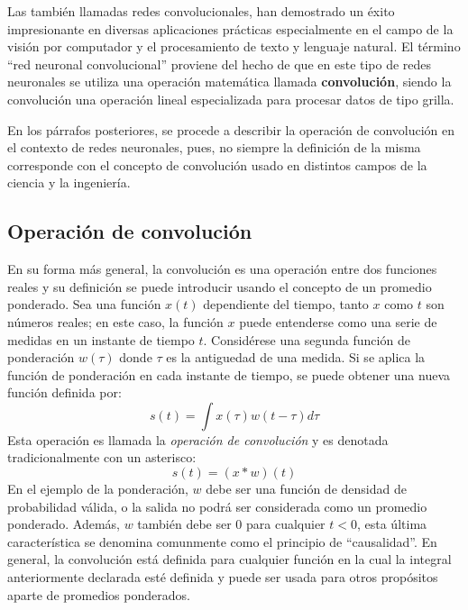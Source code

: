     Las también llamadas redes convolucionales, han demostrado un éxito impresionante en diversas 
    aplicaciones prácticas especialmente en el campo de la visión por computador y el procesamiento de texto y lenguaje natural. 
    El término ``red neuronal convolucional'' proviene del hecho de que en este tipo 
    de redes neuronales se utiliza una operación matemática llamada \textbf{convolución}, siendo la convolución 
    una operación lineal especializada para procesar datos de tipo grilla.

    En los párrafos posteriores, se procede a describir la operación de convolución en el contexto de 
    redes neuronales, pues, no siempre la definición de la misma corresponde con el concepto de convolución
    usado en distintos campos de la ciencia y la ingeniería.

        \subsection{Operación de convolución}
        En su forma más general, la convolución es una operación entre dos funciones reales y su definición se puede introducir
        usando el concepto de un promedio ponderado. Sea una función $x(t)$ dependiente del tiempo, 
        tanto $x$ como $t$ son números reales; en este caso, la función $x$ puede entenderse como una serie de medidas
        en un instante de tiempo $t$. Considérese una segunda función de ponderación $w(\tau)$ donde $\tau$ es la antiguedad 
        de una medida. Si se aplica la función de ponderación en cada instante de tiempo, se puede obtener una nueva función 
        definida por:
        \begin{equation}
            s(t) = \int x(\tau)w(t - \tau) d\tau
        \end{equation} 
        Esta operación es llamada la \textit{operación de convolución} y es denotada tradicionalmente con un asterisco:
        \begin{equation}
            s(t) = (x\ast w)(t)
        \end{equation}
        En el ejemplo de la ponderación, $w$ debe ser una función de densidad de probabilidad válida, o la salida no podrá
        ser considerada como un promedio ponderado. Además, $w$ también debe ser $0$ para cualquier $t<0$, esta última 
        característica se denomina comunmente como el principio de ``causalidad''. En general, la convolución está 
        definida para cualquier función en la cual la integral anteriormente declarada esté definida y puede ser 
        usada para otros propósitos aparte de promedios ponderados.

